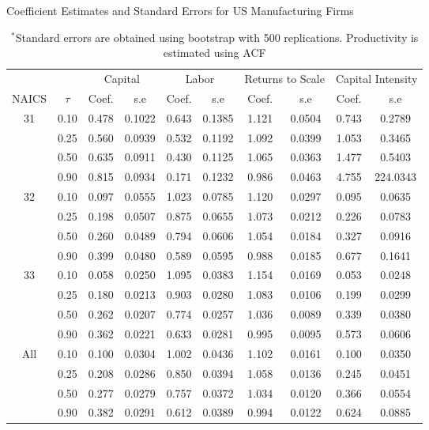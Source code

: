 \documentclass[11pt]{article}
\begin{document}
\begin{table}[H]
\centering
\caption{Coefficient Estimates and Standard Errors for US Manufacturing Firms}
\begin{tabular}{cccccccccc}
  \hline\hline & & \multicolumn{2}{c}{Capital}  & \multicolumn{2}{c}{Labor} & \multicolumn{2}{c}{Returns to Scale} & \multicolumn{2}{c}{Capital Intensity}\\ \cmidrule(lr){3-4} \cmidrule(lr){5-6} \cmidrule(lr){7-8} \cmidrule(lr){9-10}NAICS & $\tau$ & Coef. & s.e & Coef. & s.e & Coef. & s.e & Coef. & s.e \\ 
  \hline
31 & 0.10 & 0.478 & 0.1022 & 0.643 & 0.1385 & 1.121 & 0.0504 & 0.743 & 0.2789 \\ 
   & 0.25 & 0.560 & 0.0939 & 0.532 & 0.1192 & 1.092 & 0.0399 & 1.053 & 0.3465 \\ 
   & 0.50 & 0.635 & 0.0911 & 0.430 & 0.1125 & 1.065 & 0.0363 & 1.477 & 0.5403 \\ 
   & 0.90 & 0.815 & 0.0934 & 0.171 & 0.1232 & 0.986 & 0.0463 & 4.755 & 224.0343 \\ 
  32 & 0.10 & 0.097 & 0.0555 & 1.023 & 0.0785 & 1.120 & 0.0297 & 0.095 & 0.0635 \\ 
   & 0.25 & 0.198 & 0.0507 & 0.875 & 0.0655 & 1.073 & 0.0212 & 0.226 & 0.0783 \\ 
   & 0.50 & 0.260 & 0.0489 & 0.794 & 0.0606 & 1.054 & 0.0184 & 0.327 & 0.0916 \\ 
   & 0.90 & 0.399 & 0.0480 & 0.589 & 0.0595 & 0.988 & 0.0185 & 0.677 & 0.1641 \\ 
  33 & 0.10 & 0.058 & 0.0250 & 1.095 & 0.0383 & 1.154 & 0.0169 & 0.053 & 0.0248 \\ 
   & 0.25 & 0.180 & 0.0213 & 0.903 & 0.0280 & 1.083 & 0.0106 & 0.199 & 0.0299 \\ 
   & 0.50 & 0.262 & 0.0207 & 0.774 & 0.0257 & 1.036 & 0.0089 & 0.339 & 0.0380 \\ 
   & 0.90 & 0.362 & 0.0221 & 0.633 & 0.0281 & 0.995 & 0.0095 & 0.573 & 0.0606 \\ 
  All & 0.10 & 0.100 & 0.0304 & 1.002 & 0.0436 & 1.102 & 0.0161 & 0.100 & 0.0350 \\ 
   & 0.25 & 0.208 & 0.0286 & 0.850 & 0.0394 & 1.058 & 0.0136 & 0.245 & 0.0451 \\ 
   & 0.50 & 0.277 & 0.0279 & 0.757 & 0.0372 & 1.034 & 0.0120 & 0.366 & 0.0554 \\ 
   & 0.90 & 0.382 & 0.0291 & 0.612 & 0.0389 & 0.994 & 0.0122 & 0.624 & 0.0885 \\ 
   \hline
\end{tabular}
\caption*{\footnotesize $^{*}$Standard errors are obtained using bootstrap with 500 replications. Productivity is estimated using ACF}
\label{USestACF}
\end{table}
\end{document}
